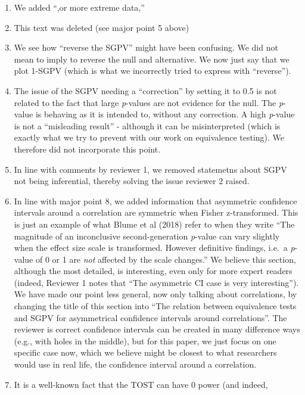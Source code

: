 \documentclass[man]{apa6}
\begin{document}
\begin{enumerate}
\def\labelenumi{\arabic{enumi}.}
\item
  We added \enquote{,or more extreme data,}
\item
  This text was deleted (see major point 5 above)
\item
  We see how \enquote{reverse the SGPV} might have been confusing. We
  did not mean to imply to reverse the null and alternative. We now just
  say that we plot 1-SGPV (which is what we incorrectly tried to express
  with \enquote{reverse}).
\item
  The issue of the SGPV needing a \enquote{correction} by setting it to
  0.5 is not related to the fact that large \emph{p}-values are not
  evidence for the null. The \emph{p}-value is behaving as it is
  intended to, without any correction. A high \emph{p}-value is not a
  \enquote{misleading result} - although it can be misinterpreted (which
  is exactly what we try to prevent with our work on equivalence
  testing). We therefore did not incorporate this point.
\item
  In line with comments by reviewer 1, we removed statemetns about SGPV
  not being inferential, thereby solving the issue reviewer 2 raised.
\item
  In line with major point 8, we added information that asymmetric
  confidence intervals around a correlation are symmetric when Fisher
  z-transformed. This is just an example of what Blume et al (2018)
  refer to when they write \enquote{The magnitude of an inconclusive
  second-generation \emph{p}-value can vary slightly when the effect
  size scale is transformed. However definitive findings, i.e.~a
  \emph{p}-value of 0 or 1 are \emph{not} affected by the scale
  changes.} We believe this section, although the most detailed, is
  interesting, even only for more expert readers (indeed, Reviewer 1
  notes that \enquote{The asymmetric CI case is very interesting}). We
  have made our point less general, now only talking about correlations,
  by changing the title of this section into \enquote{The relation
  between equivalence tests and SGPV for asymmetrical confidence
  intervals around correlations}. The reviewer is correct confidence
  intervals can be created in many difference ways (e.g., with holes in
  the middle), but for this paper, we just focus on one specific case
  now, which we believe might be closest to what researchers would use
  in real life, the confidence interval around a correlation.
\item
  It is a well-known fact that the TOST can have 0 power (and indeed,

\end{enumerate}
\end{document}
